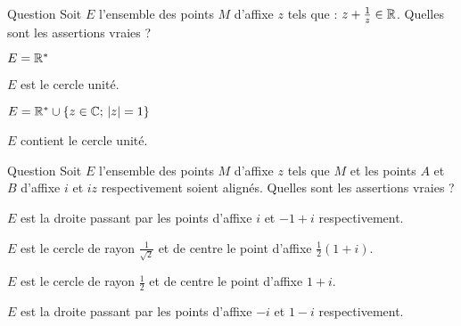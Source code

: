 \begin{multi}[multiple,feedback=
{Soit \(z \neq 0\). On a :  \(z+\frac{1}{z} \in \Rr \Leftrightarrow z+\frac{1}{z}  = \overline{z}+\frac{1}{\overline{z}}\). On multiplie par \(z\overline{z}\) et on simplifie cette égalité. 
}]{Question}
Soit \(E\) l'ensemble des points \(M\) d'affixe \(z\) tels que : \(z+\frac{1}{z} \in \mathbb{R}\). Quelles sont les assertions vraies ?

    \item \(E = \mathbb{R}^*\)
    \item \(E\) est le cercle unité.
    \item* \( E = \mathbb{R}^* \cup \{z\in \mathbb{C}; \, |z|=1\}\)
    \item* \(E\) contient le cercle unité.
\end{multi}


\begin{multi}[multiple,feedback=
{\(M(z), A(i)\) et \(B(iz)\) sont alignés si et seulement si les vecteurs \(\overrightarrow{AM}\) et \(\overrightarrow{AB}\)
sont colinéaires. On pose \(z=x+iy, \, x,y\in \Rr\). Les vecteurs \(\overrightarrow{AM}\) et \(\overrightarrow{AB}\) sont de coordonnées \((x,y-1)\) et \((-y,x-1)\) respectivement. \(M(x+iy) \in E\) si et seulement si  \(\det(\overrightarrow{AM},   \overrightarrow{AB})=0\). 
}]{Question}
Soit \(E\) l'ensemble des points \(M\) d'affixe \(z\) tels que \(M\) et les points \(A\) et \(B\) d'affixe \(i\) et \(iz\) respectivement 
soient alignés. Quelles sont les assertions vraies ?

    \item \(E\) est la droite passant par les points d'affixe \(i\) et \(-1+i\) respectivement.
    \item* \(E\) est le cercle de rayon \(\frac{1}{\sqrt 2}\)  et de centre le point d'affixe \(\frac{1}{2}(1+i)\).
    \item \(E\) est le cercle de rayon \(\frac{1}{2}\)  et de centre le point d'affixe \(1+i\).
    \item \(E\) est la droite passant par les points d'affixe \(-i\) et \(1-i\) respectivement.
\end{multi}
